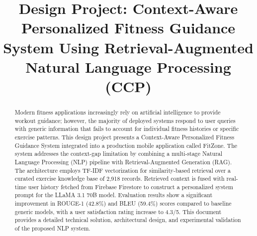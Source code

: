\documentclass[conference]{IEEEtran}
\begin{document}
\title{Design Project: Context-Aware Personalized Fitness Guidance System Using Retrieval-Augmented Natural Language Processing (CCP)}

\author{
\and
{}
}

\maketitle

\begin{abstract}
Modern fitness applications increasingly rely on artificial intelligence to provide workout guidance; however, the majority of deployed systems respond to user queries with generic information that fails to account for individual fitness histories or specific exercise patterns. This design project presents a Context-Aware Personalized Fitness Guidance System integrated into a production mobile application called FitZone. The system addresses the context-gap limitation by combining a multi-stage Natural Language Processing (NLP) pipeline with Retrieval-Augmented Generation (RAG). The architecture employs TF-IDF vectorization for similarity-based retrieval over a curated exercise knowledge base of 2,918 records. Retrieved context is fused with real-time user history fetched from Firebase Firestore to construct a personalized system prompt for the LLaMA 3.1 70B model. Evaluation results show a significant improvement in ROUGE-1 (42.8\%) and BLEU (59.4\%) scores compared to baseline generic models, with a user satisfaction rating increase to 4.3/5. This document provides a detailed technical solution, architectural design, and experimental validation of the proposed NLP system.
\end{abstract}
\end{document}
